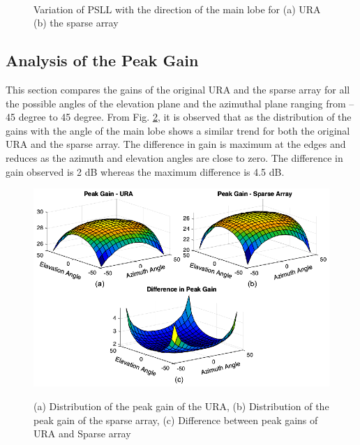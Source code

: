 \begin{figure}
  \centering
   ~~~~
  \\
  \caption{Variation of PSLL with the direction of the main lobe for (a) URA (b) the sparse array} \label{fig_5_9}
\end{figure}

\subsection{Analysis of the Peak Gain}

This section compares the gains of the original URA and the sparse array for all the possible angles of the elevation plane and the azimuthal plane ranging from -- 45 degree to 45 degree. From Fig. \ref{fig_5_10}, it is observed that as the distribution of the gains with the angle of the main lobe shows a similar trend for both the original URA and the sparse array. The difference in gain is maximum at the edges and reduces as the azimuth and elevation angles are close to zero. The difference in gain observed is 2 dB whereas the maximum difference is 4.5 dB.

\begin{figure}
  \centering
  \includegraphics[width=0.95\linewidth]{Fig-naun_10.eps}\\
  \caption{(a) Distribution of the peak gain of the URA, (b) Distribution of the peak gain of the sparse array, (c) Difference between peak gains of URA and Sparse array} \label{fig_5_10}
\end{figure}

